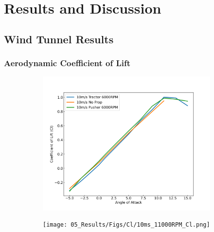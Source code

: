 \graphicspath{{./Figs/}}

\chapter{Results and Discussion} 

\section{Wind Tunnel Results}

\subsection{Aerodynamic Coefficient of Lift}

\begin{figure}
    \centering
    \begin{subfigure}[b]{0.467\textwidth}
        \centering
        \includegraphics[width=\textwidth]{05_Results/Figs/Cl/10ms_6000RPM_Cl.png}
        \caption[Coefficient of lift at 10m/s airspeed and 6000RPM motor speed]
        \label{fig:Cl_10ms_6000}
    \end{subfigure}
    \begin{subfigure}[b]{0.467\textwidth}
        \centering
        \texttt{[image: 05\_Results/Figs/Cl/10ms\_11000RPM\_Cl.png]}
        \caption[Coefficient of lift at 10m/s airspeed and 11000RPM motor speed]
        \label{fig:Cl_10ms_11000}
    \end{subfigure}
    \begin{subfigure}[b]{0.467\textwidth}

\end{subfigure}
\end{figure}
